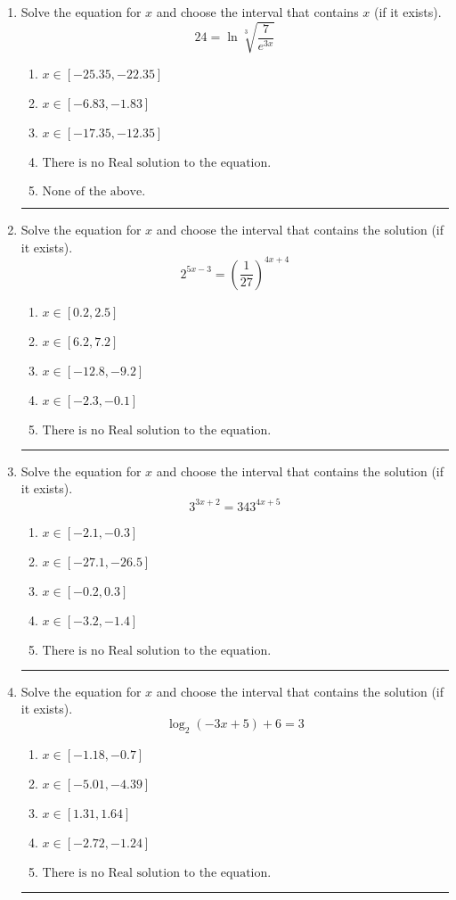 \documentclass[14pt]{extbook}
\newcommand{\litem}[1]{\item#1\hspace*{-1cm}\rule{\textwidth}{0.4pt}}
\begin{document}
\begin{enumerate}
\litem{
 Solve the equation for $x$ and choose the interval that contains $x$ (if it exists).\[  24 = \ln{\sqrt[3]{\frac{7}{e^{3x}}}} \]\begin{enumerate}[label=\Alph*.]
\item \( x \in [-25.35, -22.35] \)
\item \( x \in [-6.83, -1.83] \)
\item \( x \in [-17.35, -12.35] \)
\item \( \text{There is no Real solution to the equation.} \)
\item \( \text{None of the above.} \)

\end{enumerate} }
\litem{
Solve the equation for $x$ and choose the interval that contains the solution (if it exists).\[ 2^{5x-3} = \left(\frac{1}{27}\right)^{4x+4} \]\begin{enumerate}[label=\Alph*.]
\item \( x \in [0.2, 2.5] \)
\item \( x \in [6.2, 7.2] \)
\item \( x \in [-12.8, -9.2] \)
\item \( x \in [-2.3, -0.1] \)
\item \( \text{There is no Real solution to the equation.} \)

\end{enumerate} }
\litem{
Solve the equation for $x$ and choose the interval that contains the solution (if it exists).\[ 3^{3x+2} = 343^{4x+5} \]\begin{enumerate}[label=\Alph*.]
\item \( x \in [-2.1, -0.3] \)
\item \( x \in [-27.1, -26.5] \)
\item \( x \in [-0.2, 0.3] \)
\item \( x \in [-3.2, -1.4] \)
\item \( \text{There is no Real solution to the equation.} \)

\end{enumerate} }
\litem{
Solve the equation for $x$ and choose the interval that contains the solution (if it exists).\[ \log_{2}{(-3x+5)}+6 = 3 \]\begin{enumerate}[label=\Alph*.]
\item \( x \in [-1.18, -0.7] \)
\item \( x \in [-5.01, -4.39] \)
\item \( x \in [1.31, 1.64] \)
\item \( x \in [-2.72, -1.24] \)
\item \( \text{There is no Real solution to the equation.} \)


\end{enumerate}}
\end{enumerate}
\end{document}
